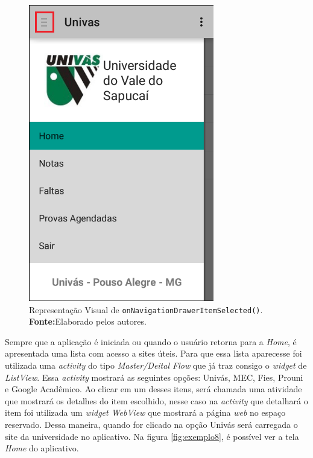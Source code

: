 		\begin{figure}[h!]
			\centerline{\includegraphics[scale=0.5]{./imagens/imagem7.png}}
			\caption[Representação Visual de
			\texttt{onNavigationDrawerItemSelected()}]{Representação Visual de
			\texttt{onNavigationDrawerItemSelected()}.
			 \textbf{Fonte:}Elaborado pelos autores.}
			\label{fig:exemplo7}
		\end{figure}
	
	\par Sempre que a aplicação é iniciada ou quando o usuário retorna para a
\textit{Home}, é apresentada uma lista com acesso a sites úteis. Para que essa
lista aparecesse foi utilizada uma \textit{activity} do tipo
\textit{Master/Deital Flow} que já traz consigo o \textit{widget} de
\textit{ListView}. Essa \textit{activity} mostrará as seguintes opções: Univás,
MEC, Fies, Prouni e Google Acadêmico. Ao clicar em um desses itens, será
chamada uma atividade que mostrará os detalhes do item escolhido, nesse caso na
\textit{activity} que detalhará o item foi utilizada um \textit{widget WebView}
que mostrará a página \textit{web} no espaço reservado. Dessa maneira, quando
for clicado na opção Univás será carregada o site da universidade no
aplicativo. Na figura \ref{fig:exemplo8}, é possível ver a tela  \textit{Home}
do aplicativo.
	
